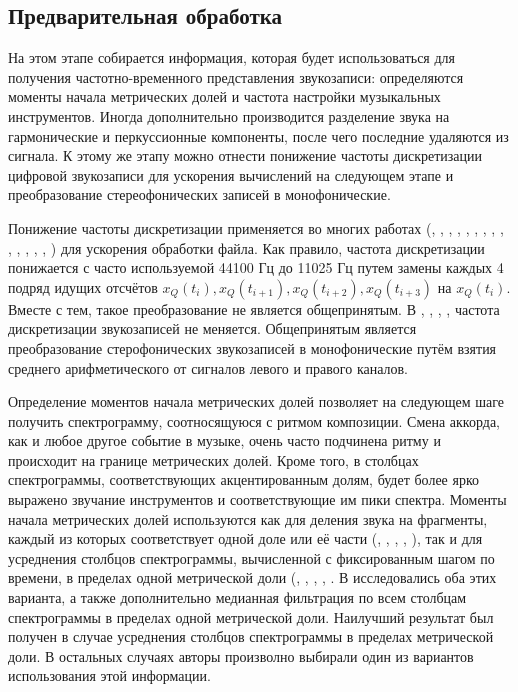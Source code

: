 \subsection{Предварительная обработка} \label{ssectT_prelim}

На этом этапе собирается информация, которая будет использоваться для получения
частотно-временного представления звукозаписи: определяются моменты начала
метрических долей и частота настройки музыкальных инструментов. Иногда
дополнительно производится разделение звука на гармонические и перкуссионные
компоненты, после чего последние удаляются из сигнала. К этому же этапу можно
отнести понижение частоты дискретизации цифровой звукозаписи для ускорения
вычислений на следующем этапе и преобразование стереофонических записей в
монофонические.

Понижение частоты дискретизации применяется во многих работах
(\cite{Sheh2003}, \cite{Bello2005}, \cite{Lee2006}, \cite{Burgoyne2007},
\cite{Lee2007}, \cite{Papadopoulos2007}, \cite{Mauch2008}, \cite{Khadkevich2009},
\cite{Mauch2009}, \cite{Oudre2009}, \cite{Reed2009}, \cite{Mauch2010},
\cite{Khadkevich2011}, \cite{Ni2011}, \cite{Humphrey2012}) для ускорения
обработки файла. Как правило, частота дискретизации понижается с часто
используемой 44100 Гц до 11025 Гц путем замены каждых 4 подряд идущих
отсчётов $x_Q(t_i), x_Q(t_{i+1}), x_Q(t_{i+2}), x_Q(t_{i+3})$ на $x_Q(t_i)$.
Вместе с тем, такое преобразование не является общепринятым. В \cite{Zhang2008},
\cite{Cho2010}, \cite{Rocher2010}, \cite{Cho2011}, \cite{DeHaas2012} частота
дискретизации звукозаписей не меняется. Общепринятым является преобразование
стерофонических звукозаписей в монофонические путём взятия среднего
арифметического от сигналов левого и правого каналов.

Определение моментов начала метрических долей позволяет на следующем шаге
получить спектрограмму, соотносящуюся с ритмом композиции. Смена аккорда, как и
любое другое событие в музыке, очень часто подчинена ритму и происходит на
границе метрических долей. Кроме того, в столбцах спектрограммы, соответствующих
акцентированным долям, будет более ярко выражено звучание инструментов и
соответствующие им пики спектра. Моменты начала метрических долей используются
как для деления звука на фрагменты, каждый из которых соответствует одной доле
или её части (\cite{Yoshioka2004}, \cite{Sumi2008}, \cite{Weller2009},
\cite{Mcvicar2011}, \cite{Ni2011}), так и для усреднения столбцов спектрограммы,
вычисленной с фиксированным шагом по времени, в пределах одной метрической доли
(\cite{Bello2005}, \cite{Mauch2009}, \cite{Mauch2010}, \cite{DeHaas2012},
\cite{Chen2012}. В \cite{Chen2012} исследовались оба этих варианта, а также
дополнительно медианная фильтрация по всем столбцам спектрограммы в пределах
одной метрической доли. Наилучший результат был получен в случае усреднения
столбцов спектрограммы в пределах метрической доли. В остальных случаях авторы
произволно выбирали один из вариантов использования этой информации.

